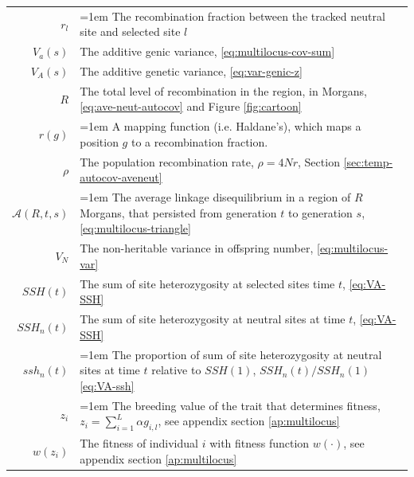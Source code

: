\documentclass[11pt]{article}
\begin{document}
\begin{table}[!htbp]
\begin{tabular}{r|p{12cm}}
 $r_l$ & \hangindent=1em The recombination fraction between the tracked neutral site and selected site $l$\\
 $V_a(s)$ & The additive genic variance, \eqref{eq:multilocus-cov-sum} \\ 
 $V_A(s)$ & The additive genetic variance, \eqref{eq:var-genic-z} \\ 
 $R$ & The total level of recombination in the region, in Morgans, \eqref{eq:ave-neut-autocov} and Figure \ref{fig:cartoon} \\ 
 $r(g)$ & \hangindent=1em A mapping function (i.e. Haldane's), which maps a position $g$ to a recombination fraction.\\ 
 $\rho$ & The population recombination rate, $\rho = 4Nr$, Section \ref{sec:temp-autocov-aveneut} \\ 
 $\mathcal{A}(R, t, s)$ & \hangindent=1em The average linkage disequilibrium in a region of $R$ Morgans, that persisted from generation $t$ to generation $s$, \eqref{eq:multilocus-triangle} \\
 $V_N$ & The non-heritable variance in offspring number, \eqref{eq:multilocus-var} \\
 $SSH(t)$ & The sum of site heterozygosity at selected sites time $t$, \eqref{eq:VA-SSH} \\
 $SSH_n(t)$ & The sum of site heterozygosity at neutral sites at time $t$, \eqref{eq:VA-SSH} \\
 $ssh_n(t)$ & \hangindent=1em The proportion of sum of site heterozygosity at neutral sites at time $t$ relative to $SSH(1)$, $SSH_n(t) / SSH_n(1)$ \eqref{eq:VA-ssh} \\
 $z_i$ & \hangindent=1em The breeding value of the trait that determines fitness, $z_i = \sum_{i=1}^L \alpha g_{i,l}$, see appendix section \ref{ap:multilocus} \\
 $w(z_i)$ & The fitness of individual $i$ with fitness function $w(\cdot)$, see appendix section \ref{ap:multilocus} \\
\end{tabular}
\end{table}
\end{document}
